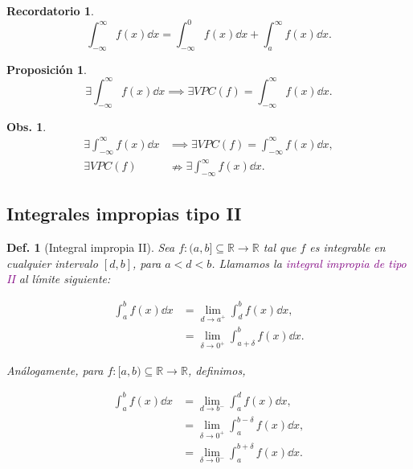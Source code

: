 \documentclass{article}
\theoremstyle{definicion}
\newtheorem{definicion}{Def.}
\theoremstyle{definition}             %
\theoremstyle{definition}             %
\theoremstyle{definition}
\newtheorem{record}{Recordatorio}
\theoremstyle{definition}
\theoremstyle{observacion}
\newtheorem{obs}{Obs.}
\theoremstyle{definition}
\newtheorem{prop}{Proposición}
\theoremstyle{plain}
\theoremstyle{definition}
\theoremstyle{afirmacion}
\theoremstyle{definition}
\begin{document}
    \begin{record}
        \vphantom{jlfjdaksjflkajdf}
        \begin{equation*}
            \int_{-\infty}^{\infty}f(x)\dd{x} = \int_{-\infty}^{0}f(x)\dd{x} + \int_{a}^{\infty}f(x)\dd{x}.
        \end{equation*}
    \end{record}

    \begin{prop}
        \vphantom{faldfhsjfhasjdhfajsf}
        \begin{equation*}
            \exists \int_{-\infty}^{\infty}f(x)\dd{x} \implies \exists VPC(f) = \int_{-\infty}^{\infty}f(x)\dd{x}.
        \end{equation*}
    \end{prop}

    \begin{obs}
        \vphantom{jdflsajfkdjflk}
        \begin{align*}
            \exists \int_{-\infty}^{\infty}f(x)\dd{x} &\implies \exists VPC(f) = \int_{-\infty}^{\infty}f(x)\dd{x},\\
            \exists VPC(f) &\nRightarrow \exists \int_{-\infty}^{\infty}f(x)\dd{x}.
        \end{align*}
    \end{obs}

    \subsection{Integrales impropias tipo II}
    
    \begin{definicion}[Integral impropia II]
        Sea \(f\colon (a,b] \subseteq \mathbb{R}\to\mathbb{R}\) tal que \(f\) es integrable en cualquier intervalo \([d,b]\), para \(a < d < b\). Llamamos la \textcolor{purple}{integral impropia de tipo II} al límite siguiente:

        \begin{align*}
            \int_{a}^{b} f(x) \dd{x} &= \lim_{d\to a^{+}}\int_{d}^{b}f(x)\dd{x},\\
            &= \lim_{\delta \to 0^{+}}\int_{a + \delta}^{b}f(x)\dd{x}.
        \end{align*}

        Análogamente, para \(f \colon [a,b)\subseteq\mathbb{R}\to\mathbb{R}\), definimos, 

        \begin{align*}
            \int_{a}^{b} f(x) \dd{x} &= \lim_{d\to b^{-}}\int_{a}^{d}f(x)\dd{x},\\
            &= \lim_{\delta \to 0^{+}}\int_{a}^{b - \delta}f(x)\dd{x},\\
            &= \lim_{\delta \to 0^{-}}\int_{a}^{b + \delta}f(x)\dd{x}.
        \end{align*}
    \end{definicion}
\end{document}
